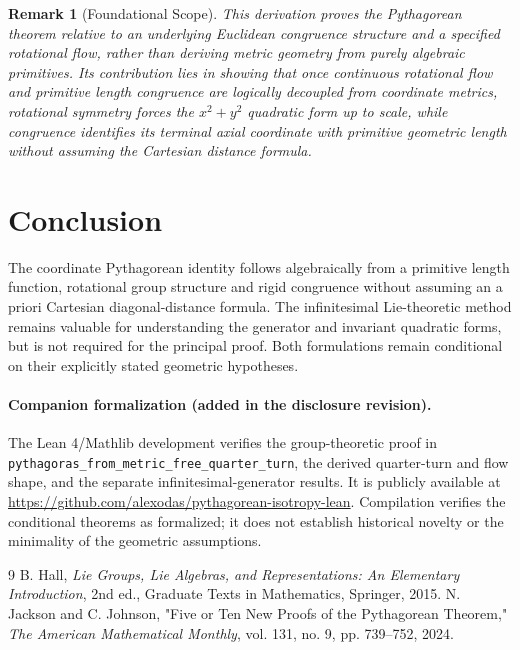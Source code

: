 \documentclass[11pt,a4paper]{article}
\newtheorem{remark}{Remark}[section]
\begin{document}
\begin{remark}[Foundational Scope]
This derivation proves the Pythagorean theorem relative to an underlying Euclidean congruence structure and a specified rotational flow, rather than deriving metric geometry from purely algebraic primitives. Its contribution lies in showing that once continuous rotational flow and primitive length congruence are logically decoupled from coordinate metrics, rotational symmetry forces the $x^2+y^2$ quadratic form up to scale, while congruence identifies its terminal axial coordinate with primitive geometric length without assuming the Cartesian distance formula.
\end{remark}

\section{Conclusion}
The coordinate Pythagorean identity follows algebraically from a primitive length function, rotational group structure and rigid congruence without assuming an a priori Cartesian diagonal-distance formula. The infinitesimal Lie-theoretic method remains valuable for understanding the generator and invariant quadratic forms, but is not required for the principal proof. Both formulations remain conditional on their explicitly stated geometric hypotheses.

\paragraph{Companion formalization (added in the disclosure revision).}
The Lean 4/Mathlib development verifies the group-theoretic proof in \texttt{pythagoras\_from\_metric\_free\_quarter\_turn}, the derived quarter-turn and flow shape, and the separate infinitesimal-generator results. It is publicly available at
\url{https://github.com/alexodas/pythagorean-isotropy-lean}.
Compilation verifies the conditional theorems as formalized; it does not establish historical novelty or the minimality of the geometric assumptions.

\begin{thebibliography}{9}
 B. Hall, \emph{Lie Groups, Lie Algebras, and Representations: An Elementary Introduction}, 2nd ed., Graduate Texts in Mathematics, Springer, 2015.
 N. Jackson and C. Johnson, "Five or Ten New Proofs of the Pythagorean Theorem," \emph{The American Mathematical Monthly}, vol. 131, no. 9, pp. 739--752, 2024.
\end{thebibliography}
\end{document}
